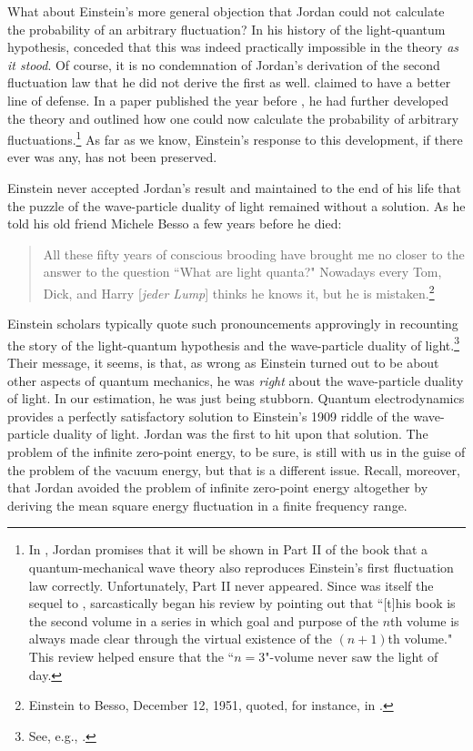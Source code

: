 \documentclass[12pt]{elsart}
\begin{document}
What about Einstein's more general objection that Jordan could not calculate the probability of an arbitrary fluctuation? In his history of the light-quantum hypothesis, \citet[p.\ 194]{Jordan 1928} conceded that this was indeed practically impossible in the theory {\it as it stood}. Of course, it is no condemnation of Jordan's derivation of the second fluctuation law that he did not derive the first as well. \citet[p.\ 194, p.\ 201]{Jordan 1928} claimed to have a better line of defense. In a paper published the year before \citep[pp.\ 772--774]{Jordan 1927c}, he had further developed the theory and outlined how one could now calculate the probability of arbitrary fluctuations.\footnote{In \citep[p.\ 399]{Born and Jordan 1930}, Jordan promises that it will be shown in Part II of the book that a quantum-mechanical wave theory also reproduces Einstein's first fluctuation law correctly. Unfortunately, Part II never appeared. Since \citep[p.\ 399]{Born and Jordan 1930} was itself the sequel to \citep{Born 1925}, \citet{Pauli 1930} sarcastically began his review by pointing out that ``[t]his book is the second volume in a series in which goal and purpose of the $n$th volume is always made clear through the virtual existence of the $(n+1)$th volume." This review helped ensure that the ``$n=3$"-volume never saw the light of day.} As far as we know, Einstein's response to this development, if there ever was any, has not been preserved. 

Einstein never accepted Jordan's result and maintained to the end of his life that the puzzle of the wave-particle duality of light remained without a solution. As he told his old friend Michele Besso a few years before he died:
\begin{quotation}
All these fifty years of conscious brooding have brought me no closer to the answer to the question ``What are light quanta?" Nowadays every Tom, Dick, and Harry [{\it jeder Lump}] thinks he knows it, but he is mistaken.\footnote{Einstein to Besso, December 12, 1951, quoted, for instance, in \citep[p.\ 133, p.\ 138]{Klein 1979}.}
\end{quotation}
Einstein scholars typically quote such pronouncements approvingly in recounting the story of the light-quantum hypothesis and the wave-particle duality of light.\footnote{See, e.g., \citep[pp.\ 379--380]{Stachel 1986}.} Their message, it seems, is that, as wrong as Einstein turned out to be about other aspects of quantum mechanics, he was {\it right} about the wave-particle duality of light. In our estimation, he was just being stubborn. Quantum electrodynamics provides a perfectly satisfactory solution to Einstein's 1909 riddle of the wave-particle duality of light. Jordan was the first to hit upon that solution. The problem of the infinite zero-point energy, to be sure, is still with us in the guise of the problem of the vacuum energy, but that is a different issue. Recall, moreover, that Jordan avoided the problem of infinite zero-point energy altogether by deriving the mean square energy fluctuation in a finite frequency range. 
\end{document}
